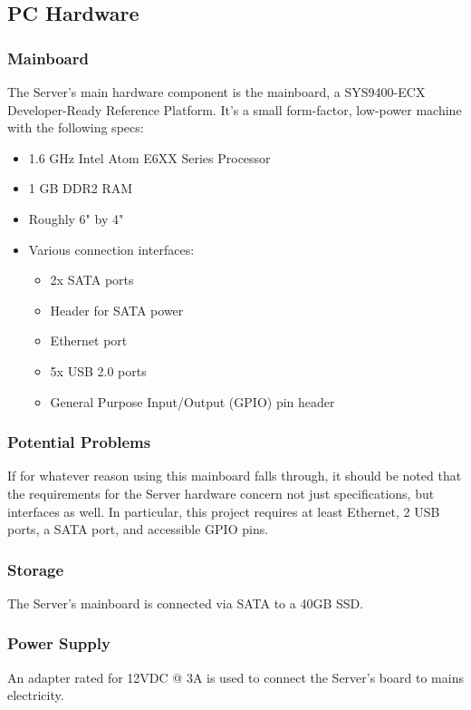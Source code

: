 
\subsection{PC Hardware}

\subsubsection{Mainboard}
The Server's main hardware component is the mainboard, a SYS9400-ECX Developer-Ready Reference Platform. 
It's a small form-factor, low-power machine with the following specs:

\begin{itemize}
	\item 1.6 GHz Intel Atom E6XX Series Processor
	\item 1 GB DDR2 RAM
	\item Roughly 6" by 4"
	\item Various connection interfaces:
	\begin{itemize}
		\item 2x SATA ports
		\item Header for SATA power
		\item Ethernet port
		\item 5x USB 2.0 ports
		\item General Purpose Input/Output (GPIO) pin header
	\end{itemize}
\end{itemize}

\subsubsection{Potential Problems}
If for whatever reason using this mainboard falls through, it should be noted that the requirements for the Server hardware concern not just specifications, but interfaces as well.
In particular, this project requires at least Ethernet, 2 USB ports, a SATA port, and accessible GPIO pins.
\subsubsection{Storage}
The Server's mainboard is connected via SATA to a 40GB SSD.

\subsubsection{Power Supply}
An adapter rated for 12VDC @ 3A is used to connect the Server's board to mains electricity.
